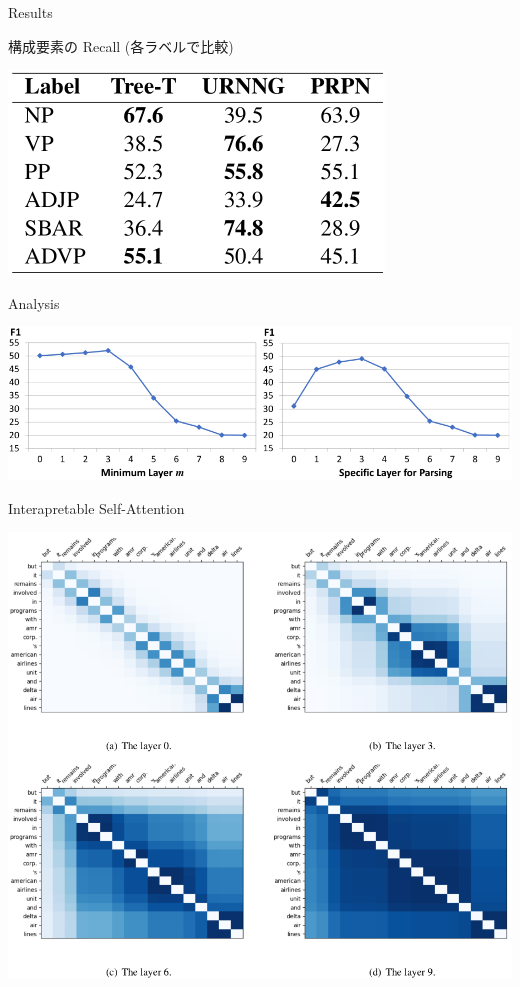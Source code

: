 \documentclass[unicode, 12pt, aspectratio=43]{beamer}
\begin{document}
\begin{frame}[label={sec:org6fd6632}]{Results}
\begin{block}{構成要素の Recall (各ラベルで比較)}
\begin{center}
\includegraphics[width=0.5\linewidth]{./figure/Table3.pdf}
\end{center}
\end{block}
\end{frame}

\begin{frame}[label={sec:org2a42c67}]{Analysis}
\begin{center}
\includegraphics[width=\linewidth]{./figure/Figure4.pdf}
\end{center}
\end{frame}

\begin{frame}[label={sec:org5710da1}]{Interapretable Self-Attention}
\begin{center}
\includegraphics[width=0.8\linewidth]{./figure/Figure5.pdf}
\end{center}
\end{frame}
\end{document}
